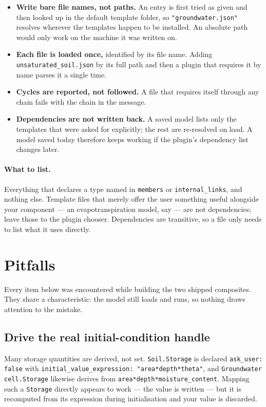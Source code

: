 \documentclass[11pt,a4paper]{article}
\newcommand{\code}[1]{\texttt{\small #1}}
\newcommand{\file}[1]{\texttt{\small #1}}
\begin{document}
\begin{itemize}[leftmargin=1.4em]
\item \textbf{Write bare file names, not paths.} An entry is first tried as
given and then looked up in the default template folder, so
\code{"groundwater.json"} resolves wherever the templates happen to be
installed. An absolute path would only work on the machine it was written on.
\item \textbf{Each file is loaded once,} identified by its file name. Adding
\file{unsaturated\_soil.json} by its full path and then a plugin that requires
it by name parses it a single time.
\item \textbf{Cycles are reported, not followed.} A file that requires itself
through any chain fails with the chain in the message.
\item \textbf{Dependencies are not written back.} A saved model lists only the
templates that were asked for explicitly; the rest are re-resolved on load. A
model saved today therefore keeps working if the plugin's dependency list
changes later.
\end{itemize}

\paragraph{What to list.}
Everything that declares a type named in \code{members} or
\code{internal\_links}, and nothing else. Template files that merely offer the
user something useful alongside your component --- an evapotranspiration model,
say --- are not dependencies; leave those to the plugin chooser. Dependencies
are transitive, so a file only needs to list what it uses directly.

\section{Pitfalls}

Every item below was encountered while building the two shipped composites.
They share a characteristic: the model still loads and runs, so nothing draws
attention to the mistake.

\subsection{Drive the real initial-condition handle}\label{sec:initial}

Many storage quantities are derived, not set. \code{Soil.Storage} is declared
\code{ask\_user: false} with
\code{initial\_value\_expression: "area*depth*theta"}, and
\code{Groundwater cell.Storage} likewise derives from
\code{area*depth*moisture\_content}. Mapping such a \code{Storage} directly
appears to work --- the value is written --- but it is recomputed from its
expression during initialisation and your value is discarded.
\end{document}
